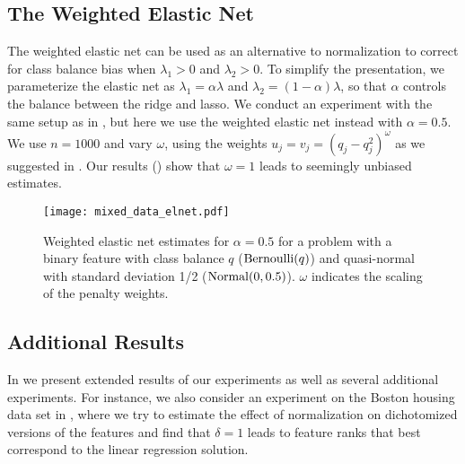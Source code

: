 \subsection{The Weighted Elastic Net}

The weighted elastic net can be used as an alternative to normalization to correct for
class balance bias when \(\lambda_1 > 0\) and \(\lambda_2 >0\). To simplify the
presentation, we parameterize the elastic net as \(\lambda_1 = \alpha \lambda \) and
\(\lambda_2 = (1-\alpha) \lambda\), so that \(\alpha\) controls the balance between the
ridge and lasso. We conduct an experiment with the same setup as in
, but here we use the weighted elastic net instead with
\(\alpha = 0.5\). We use \(n=1000\) and vary \(\omega\), using the weights \(u_j = v_j =
(q_j - q_j^2)^{\omega}\) as we suggested in . Our results
() show that \(\omega = 1\) leads to seemingly unbiased
estimates.

\begin{figure}[htpb]
  \centering
  \texttt{[image: mixed\_data\_elnet.pdf]}
  \caption{%
    Weighted elastic net estimates for \(\alpha = 0.5\) for a problem with a binary
    feature with class balance \(q\) (\(\operatorname{Bernoulli}(q)\)) and quasi-normal
    with standard deviation 1/2 (\(\operatorname{Normal}(0, 0.5)\)). \(\omega\) indicates
    the scaling of the penalty weights.
  }
  \label{fig:mixed-data-elnet}
\end{figure}

\subsection{Additional Results}

In  we present extended results of our experiments as well
as several additional experiments. For instance, we also consider an experiment on the
Boston housing data set in , where we try to estimate the effect
of normalization on dichotomized versions of the features and find that \(\delta = 1\)
leads to feature ranks that best correspond to the linear regression solution.

